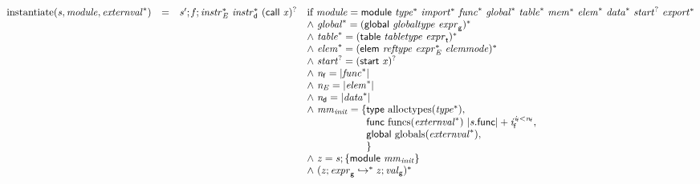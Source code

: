 $$
\begin{array}{@{}lcl@{}l@{}}
{\mathrm{instantiate}}({\mathit{s}}, {\mathit{module}}, {{\mathit{externval}}^\ast}) &=& {\mathit{s}'} ; {\mathit{f}} ; {{\mathit{instr}}_{{\mathit{E}}}^\ast}~{{\mathit{instr}}_{{\mathsf{d}}}^\ast}~{(\mathsf{call}~{\mathit{x}})^?} &\quad
  \mbox{if}~{\mathit{module}} = \mathsf{module}~{{\mathit{type}}^\ast}~{{\mathit{import}}^\ast}~{{\mathit{func}}^\ast}~{{\mathit{global}}^\ast}~{{\mathit{table}}^\ast}~{{\mathit{mem}}^\ast}~{{\mathit{elem}}^\ast}~{{\mathit{data}}^\ast}~{{\mathit{start}}^?}~{{\mathit{export}}^\ast} \\
 &&&\quad {\land}~{{\mathit{global}}^\ast} = {(\mathsf{global}~{\mathit{globaltype}}~{\mathit{expr}}_{{\mathsf{g}}})^\ast} \\
 &&&\quad {\land}~{{\mathit{table}}^\ast} = {(\mathsf{table}~{\mathit{tabletype}}~{\mathit{expr}}_{{\mathsf{t}}})^\ast} \\
 &&&\quad {\land}~{{\mathit{elem}}^\ast} = {(\mathsf{elem}~{\mathit{reftype}}~{{\mathit{expr}}_{{\mathit{E}}}^\ast}~{\mathit{elemmode}})^\ast} \\
 &&&\quad {\land}~{{\mathit{start}}^?} = {(\mathsf{start}~{\mathit{x}})^?} \\
 &&&\quad {\land}~{\mathit{n}}_{{\mathsf{f}}} = {|{{\mathit{func}}^\ast}|} \\
 &&&\quad {\land}~{\mathit{n}}_{{\mathit{E}}} = {|{{\mathit{elem}}^\ast}|} \\
 &&&\quad {\land}~{\mathit{n}}_{{\mathsf{d}}} = {|{{\mathit{data}}^\ast}|} \\
 &&&\quad {\land}~{\mathit{mm}}_{{\mathit{init}}} = \{ \begin{array}[t]{@{}l@{}}
\mathsf{type}~{\mathrm{alloctypes}}({{\mathit{type}}^\ast}),\; \\
  \mathsf{func}~{\mathrm{funcs}}({{\mathit{externval}}^\ast})~{{|{\mathit{s}}.\mathsf{func}|} + {\mathit{i}}_{{\mathsf{f}}}^{{\mathit{i}}_{{\mathsf{f}}}<{\mathit{n}}_{{\mathsf{f}}}}},\; \\
  \mathsf{global}~{\mathrm{globals}}({{\mathit{externval}}^\ast}),\; \\
   \}\end{array} \\
 &&&\quad {\land}~{\mathit{z}} = {\mathit{s}} ; \{ \begin{array}[t]{@{}l@{}}
\mathsf{module}~{\mathit{mm}}_{{\mathit{init}}} \}\end{array} \\
 &&&\quad {\land}~({\mathit{z}} ; {\mathit{expr}}_{{\mathsf{g}}} \hookrightarrow^\ast {\mathit{z}} ; {\mathit{val}}_{{\mathsf{g}}})^\ast \\

\end{array}$$
